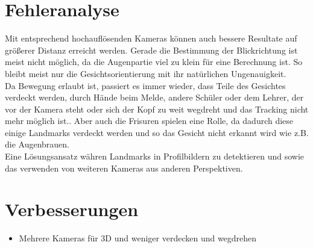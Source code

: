 \section{Fehleranalyse}
Mit entsprechend hochauflösenden Kameras können auch bessere Resultate auf größerer Distanz erreicht werden. Gerade die Bestimmung der Blickrichtung ist meist nicht möglich, da die Augenpartie viel zu klein für eine Berechnung ist. So bleibt meist nur die Gesichtsorientierung mit ihr natürlichen Ungenauigkeit.\\
Da Bewegung erlaubt ist, passiert es immer wieder, dass Teile des Gesichtes verdeckt werden, durch Hände beim Melde, andere Schüler oder dem Lehrer, der vor der Kamera steht oder sich der Kopf zu weit wegdreht und das Tracking nicht mehr möglich ist.. Aber auch die Frisuren spielen eine Rolle, da dadurch diese einige Landmarks verdeckt werden und so das Gesicht nicht erkannt wird wie z.B. die Augenbrauen.\\
Eine Lösungsansatz währen Landmarks in Profilbildern zu detektieren und sowie das verwenden von weiteren Kameras aus anderen Perspektiven.\\
\section{Verbesserungen}
\begin{itemize}
	\item Mehrere Kameras für 3D und weniger verdecken und wegdrehen
\end{itemize}